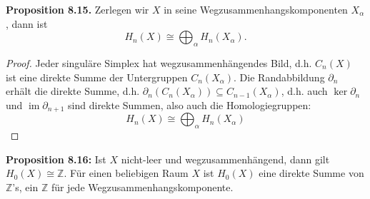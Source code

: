 \documentclass[fleqn, 12pt, letterpaper]{article}
\begin{document}
\textbf{Proposition 8.15.} Zerlegen wir $X$ in seine Wegzusammenhangskomponenten $X_\alpha$, dann ist 
\[
H_n(X) \cong \bigoplus_\alpha H_n(X_\alpha).
\]

\begin{proof}
    Jeder singuläre Simplex hat wegzusammenhängendes Bild, d.h. $C_n(X)$ ist eine direkte Summe der Untergruppen $C_n(X_\alpha)$. Die Randabbildung $\partial_n$ erhält die direkte Summe, d.h. $\partial_n(C_n(X_\alpha)) \subseteq C_{n-1}(X_\alpha)$, 
d.h. auch $\ker \partial_n$ und $\operatorname{im} \partial_{n+1}$ sind direkte Summen, also auch die Homologiegruppen:
\[
H_n(X) \cong \bigoplus_\alpha H_n(X_\alpha)
\]
\end{proof}

\textbf{Proposition 8.16:} Ist $X$ nicht-leer und wegzusammenhängend, dann gilt $H_0(X) \cong \mathbb{Z}$.
Für einen beliebigen Raum $X$ ist $H_0(X)$ eine direkte Summe von $\mathbb{Z}$'s, ein $\mathbb{Z}$ für jede Wegzusammenhangskomponente.
\end{document}
